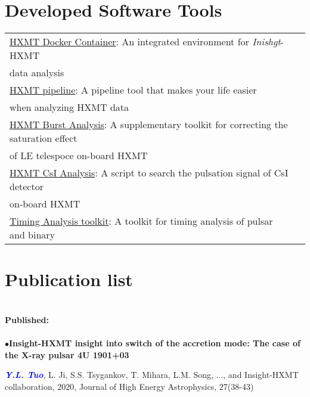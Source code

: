 \documentclass[a4paper,12pt]{article}
\newcommand{\pubbullet}{$\bullet$\hspace{0.4cm}}
\begin{document}
\section{\textbf{Developed Software Tools}}

\begin{tabular}{l l}
 \href{https://github.com/tuoyl/hxmt_docker}{HXMT Docker Container}: An integrated environment for \textit{Inishgt}-HXMT \\
 \hspace{4.8cm} data analysis\\
 \href{http://code.ihep.ac.cn/hxmthsdc/hxmt_pipeline}{HXMT pipeline}:\hspace{1.8cm} A pipeline tool that makes your life easier \\
 \hspace{4.8cm} when analyzing HXMT data\\
\href{https://github.com/tuoyl/HXMT_BurstAnalysis}{HXMT Burst Analysis}:\hspace{0.6cm} A supplementary toolkit for correcting the saturation effect \\
\hspace{4.8cm} of LE telespoce on-board HXMT\\
\href{https://github.com/tuoyl/CsI_analysis}{HXMT CsI Analysis}:\hspace{1cm} A script to search the pulsation signal of CsI detector \\
\hspace{4.8cm} on-board HXMT\\
\href{https://github.com/tuoyl/TimingAnalysis}{Timing Analysis toolkit}:\hspace{0.4cm} A toolkit for timing analysis of pulsar and binary
 
\end{tabular}



\newpage

\section{\textbf{Publication list}}
     \hspace{2cm}\\
\textbf{Published:}\\
\noindent\makebox[0.5\linewidth]{\rule{0.5\textwidth}{1pt}} \\
\pubbullet{}\textbf{Insight-HXMT insight into switch of the accretion mode: The case of the X-ray pulsar 4U 1901+03}
\begin{description}
\item \textcolor{blue}{\textit{\textbf{Y.L. Tuo}}}, L. Ji, S.S. Tsygankov, T. Mihara, L.M. Song, ..., and Insight-HXMT collaboration, 2020, Journal of High Energy Astrophysics, 27(38-43)
\end{description}
\end{document}
